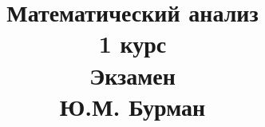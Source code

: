 \documentclass[fleqn]{article}
\title{Математический анализ \\ 1 курс \\ Экзамен \\  Ю.М. Бурман}
\date{}
\begin{document}
	\maketitle
	\pagebreak	
	\tableofcontents
	
	
	
\end{document}
